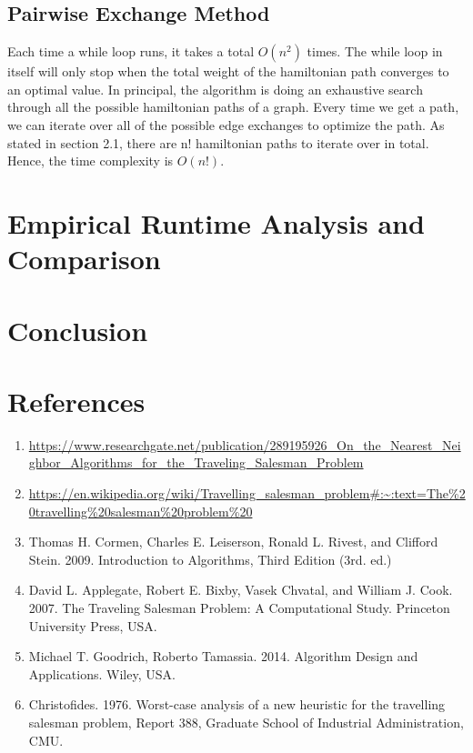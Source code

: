 \documentclass[11pt]{article}
\begin{document}
    \subsection{Pairwise Exchange Method}
Each time a while loop runs, it takes a total $O(n^2)$ times. The while loop in itself will only stop when the total weight of the hamiltonian path converges to an optimal value. In principal, the algorithm is doing an exhaustive search through all the possible hamiltonian paths of a graph. Every time we get a path, we can iterate over all of the possible edge exchanges to optimize the path. As stated in section 2.1, there are n! hamiltonian paths to iterate over in total. Hence, the time complexity is $O(n!)$.
\section{Empirical Runtime Analysis and Comparison}
\section{Conclusion}
\newpage
\section{References}
\begin{enumerate}
	\item \url{https://www.researchgate.net/publication/289195926_On_the_Nearest_Neighbor_Algorithms_for_the_Traveling_Salesman_Problem}
	\item \url{https://en.wikipedia.org/wiki/Travelling_salesman_problem#:~:text=The%20travelling%20salesman%20problem%20}
	\item Thomas H. Cormen, Charles E. Leiserson, Ronald L. Rivest, and Clifford Stein. 2009. Introduction to Algorithms, Third Edition (3rd. ed.)
	\item David L. Applegate, Robert E. Bixby, Vasek Chvatal, and William J. Cook. 2007. The Traveling Salesman Problem: A Computational Study. Princeton University Press, USA.
	\item Michael T. Goodrich, Roberto Tamassia. 2014. Algorithm Design and Applications. Wiley, USA. 
	\item Christofides. 1976. Worst-case analysis of a new heuristic for the travelling salesman problem, Report 388, Graduate School of Industrial Administration, CMU.
\end{enumerate}
\end{document}
